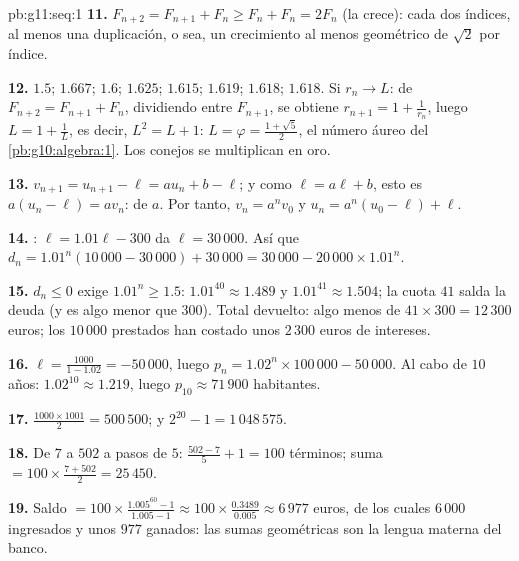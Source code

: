 \begin{solution}{pb:g11:seq:1}
\textbf{11.} $F_{n+2} = F_{n+1} + F_n \geq F_n + F_n = 2F_n$ (la 
crece): cada dos índices, al menos una duplicación, o sea, un crecimiento
al menos geométrico de  $\sqrt2$ por índice.

\textbf{12.} $1.5$; $1.667$; $1.6$; $1.625$; $1.615$; $1.619$; $1.618$;
$1.618$. Si $r_n \to L$: de $F_{n+2} = F_{n+1} + F_n$, dividiendo entre
$F_{n+1}$, se obtiene $r_{n+1} = 1 + \frac{1}{r_n}$, luego
$L = 1 + \frac1L$, es decir, $L^2 = L + 1$: $L = \varphi =
\frac{1 + \sqrt5}{2}$, el número áureo del \cref{pb:g10:algebra:1}. Los
conejos se multiplican en oro.

\textbf{13.} $v_{n+1} = u_{n+1} - \ell = a u_n + b - \ell$; y como
$\ell = a\ell + b$, esto es $a(u_n - \ell) = a v_n$: 
de  $a$. Por tanto, $v_n = a^n v_0$ y
$u_n = a^n (u_0 - \ell) + \ell$.

\textbf{14.} : $\ell = 1.01\ell - 300$ da $\ell = 30\,000$. Así
que $d_n = 1.01^n (10\,000 - 30\,000) + 30\,000
= 30\,000 - 20\,000 \times 1.01^n$.

\textbf{15.} $d_n \leq 0$ exige $1.01^n \geq 1.5$:
$1.01^{40} \approx 1.489$ y $1.01^{41} \approx 1.504$; la cuota $41$
salda la deuda (y es algo menor que $300$). Total devuelto: algo menos de
$41 \times 300 = 12\,300$ euros; los $10\,000$ prestados han costado unos
$2\,300$ euros de intereses.

\textbf{16.}  $\ell = \frac{1000}{1 - 1.02} = -50\,000$, luego
$p_n = 1.02^n \times 100\,000 - 50\,000$. Al cabo de $10$ años:
$1.02^{10} \approx 1.219$, luego $p_{10} \approx 71\,900$ habitantes.

\textbf{17.} $\frac{1000 \times 1001}{2} = 500\,500$; y
$2^{20} - 1 = 1\,048\,575$.

\textbf{18.} De $7$ a $502$ a pasos de $5$: $\frac{502 - 7}{5} + 1 = 100$
términos; suma $= 100 \times \frac{7 + 502}{2} = 25\,450$.

\textbf{19.} Saldo $= 100 \times \frac{1.005^{60} - 1}{1.005 - 1}
\approx 100 \times \frac{0.3489}{0.005} \approx 6\,977$ euros, de los
cuales $6\,000$ ingresados y unos $977$ ganados: las sumas geométricas son
la lengua materna del banco.


\end{solution}
